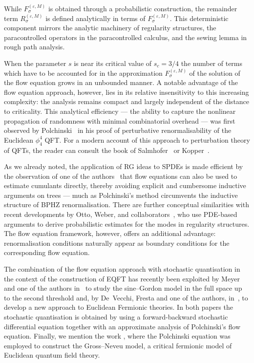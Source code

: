 \documentclass{article}
\numberwithin{equation}{section}
\theoremstyle{plain}
\theoremstyle{definition}
\begin{document}
While $F_{\sigma}^{(\varepsilon, M)}$ is obtained through a probabilistic
construction, the remainder term $R_{\sigma}^{(\varepsilon, M)}$ is defined
analytically in terms of $F_{\sigma}^{(\varepsilon, M)}$. This deterministic
component mirrors the analytic machinery of regularity structures, the
paracontrolled operators in the paracontrolled calculus, and the sewing lemma
in rough path analysis.

When the parameter $s$ is near its critical value of $s_c = 3 / 4$ the number
of terms which have to be accounted for in the approximation
$F_{\sigma}^{(\varepsilon, M)}$ of the solution of the flow equation grows in
an unbounded manner. A notable advantage of the flow equation approach,
however, lies in its relative insensitivity to this increasing complexity: the
analysis remains compact and largely independent of the distance to
criticality. This analytical efficiency --- the ability to capture the
nonlinear propagation of randomness with minimal combinatorial overhead ---
was first observed by
Polchinski~{\cite{polchinskiRenormalizationEffectiveLagrangians1984}} in his
proof of perturbative renormalisability of the Euclidean $\phi^4_4$ QFT. For a
modern account of this approach to perturbation theory of QFTs, the reader can
consult the book of
Salmhofer~{\cite{salmhoferRenormalizationIntroduction2007}} or
Kopper~{\cite{kopperRenormalizationTheoryBased2007}}.

As we already noted, the application of RG ideas to SPDEs is made efficient by
the observation of one of the
authors~{\cite{duchFlowEquationApproach2021,duchRenormalizationSingularElliptic2022}}
that flow equations can also be used to estimate cumulants directly, thereby
avoiding explicit and cumbersome inductive arguments on trees --- much as
Polchinski's method circumvents the inductive structure of BPHZ
renormalisation. There are further conceptual similarities with recent
developments by Otto, Weber, and
collaborators~{\cite{ottoPrioriBoundsQuasilinear2021,linaresDiagramfreeApproachStochastic2021}},
who use PDE-based arguments to derive probabilistic estimates for the modes in
regularity structures. The flow equation framework, however, offers an
additional advantage: renormalisation conditions naturally appear as boundary
conditions for the corresponding flow equation.

The combination of the flow equation approach with stochastic quantisation in
the context of the construction of EQFT has recently been exploited by Meyer
and one of the authors in~{\cite{gubinelliFBSDEApproachSineGordon2024}} to
study the sine--Gordon model in the full space up to the second threshold and,
by De~Vecchi, Fresta and one of the authors,
in~{\cite{devecchiStochasticAnalysisSubcritical2022}}, to develop a new
approach to Euclidean Fermionic theories. In both papers the stochastic
quantisation is obtained by using a forward-backward stochastic differential
equation together with an approximate analysis of Polchinski's flow equation.
Finally, we mention the work {\cite{duch2024construction}},
where the Polchinski equation was employed to construct the Gross--Neveu
model, a critical fermionic model of Euclidean quantum field theory.
\end{document}
